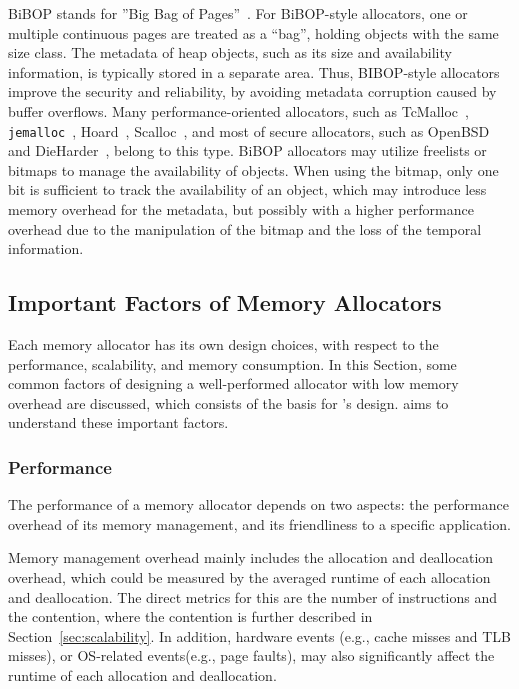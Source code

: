 BiBOP stands for ''Big Bag of Pages''~\citep{hanson1980}. For BiBOP-style allocators, one or multiple continuous pages are treated as a ``bag'', holding objects with the same size class. The metadata of heap objects, such as its size and availability information, is typically stored in a separate area. Thus, BIBOP-style allocators improve the security and reliability, by avoiding metadata corruption caused by buffer overflows. Many performance-oriented allocators, such as TcMalloc~\citep{TCMalloc}, \texttt{jemalloc}~\citep{jemalloc}, Hoard~\citep{Hoard}, Scalloc~\citep{Scalloc}, and most of secure allocators, such as OpenBSD~\citep{OpenBSD} and DieHarder~\citep{DieHarder}, belong to this type. BiBOP allocators may utilize freelists or bitmaps to manage the availability of objects. When using the bitmap, only one bit is sufficient to track the availability of an object, which may introduce less memory overhead for the metadata, but possibly with a higher performance overhead due to the manipulation of the bitmap and the loss of the temporal information.  


\subsection{Important Factors of Memory Allocators}

\label{sec:factors}

Each memory allocator has its own design choices, with respect to the performance, scalability, and memory consumption. In this Section, some common factors of designing a well-performed allocator with low memory overhead are discussed, which consists of the basis for \MP{}'s design. \MP{} aims to understand these important factors. 

\subsubsection{Performance}
\label{sec:performance}

The performance of a memory allocator depends on two aspects: the performance overhead of its memory management, and its friendliness to a specific application. 

Memory management overhead mainly includes the allocation and deallocation overhead, which could be measured by the averaged runtime of each allocation and deallocation. The  direct metrics for this are the number of instructions and the contention, where the contention is further described in Section~\ref{sec:scalability}. In addition, hardware events (e.g., cache misses and TLB misses), or OS-related events(e.g., page faults), may also significantly affect the runtime of each allocation and deallocation. %

